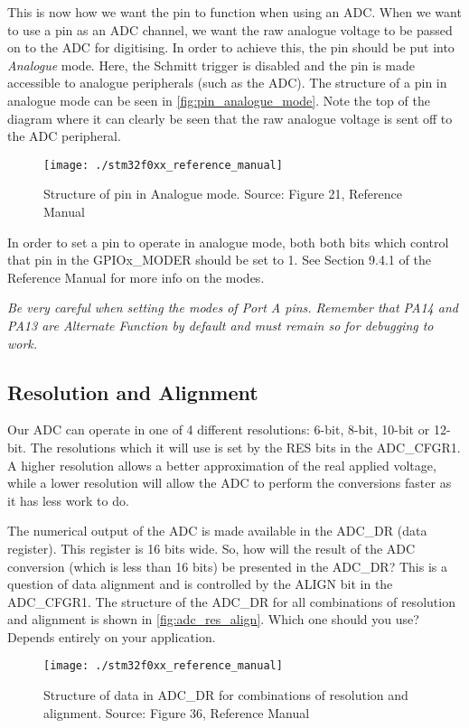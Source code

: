 This is now how we want the pin to function when using an ADC. When we want to use a pin as an ADC channel, we want the raw analogue voltage to be passed on to the ADC for digitising. In order to achieve this, the pin should be put into \emph{Analogue} mode. Here, the Schmitt trigger is disabled and the pin is made accessible to analogue peripherals (such as the ADC). The structure of a pin in analogue mode can be seen in \autoref{fig:pin_analogue_mode}. Note the top of the diagram where it can clearly be seen that the raw analogue voltage is sent off to the ADC peripheral.

\begin{figure}
\centering
\texttt{[image: ./stm32f0xx\_reference\_manual]}
\caption{Structure of pin in Analogue mode. Source: Figure 21, Reference Manual}
\label{fig:pin_analogue_mode}
\end{figure}

In order to set a pin to operate in analogue mode, both both bits which control that pin in the GPIOx\_MODER should be set to 1. See Section 9.4.1 of the Reference Manual for more info on the modes. 

\emph{Be very careful when setting the modes of Port A pins. Remember that PA14 and PA13 are Alternate Function by default and must remain so for debugging to work.}


\subsection{Resolution and Alignment}
Our ADC can operate in one of 4 different resolutions: 6-bit, 8-bit, 10-bit or 12-bit. The resolutions which it will use is set by the RES bits in the ADC\_CFGR1. A higher resolution allows a better approximation of the real applied voltage, while a lower resolution will allow the ADC to perform the conversions faster as it has less work to do.

The numerical output of the ADC is made available in the ADC\_DR (data register). This register is 16 bits wide. So, how will the result of the ADC conversion (which is less than 16 bits) be presented in the ADC\_DR? This is a question of data alignment and is controlled by the ALIGN bit in the ADC\_CFGR1. The structure of the ADC\_DR for all combinations of resolution and alignment is shown in \autoref{fig:adc_res_align}. Which one should you use? Depends entirely on your application. 

\begin{figure}
\centering
\texttt{[image: ./stm32f0xx\_reference\_manual]}
\caption{Structure of data in ADC\_DR for combinations of resolution and alignment. Source: Figure 36, Reference Manual}
\label{fig:adc_res_align}
\end{figure}


